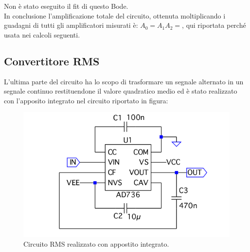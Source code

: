 \documentclass[10pt,a4paper]{article}
\begin{document}
Non è stato eseguito il fit di questo Bode.\\

In conclusione l'amplificazione totale del circuito, ottenuta moltiplicando i guadagni di tutti gli amplificatori misurati è: $A_0 = A_1 A_2 = $, qui riportata perché usata nei calcoli seguenti.\\

\subsection{Convertitore RMS}
L'ultima parte del circuito ha lo scopo di trasformare un segnale alternato in un segnale continuo restituendone il valore quadratico medio ed è stato realizzato con l'apposito integrato nel circuito riportato in figura:

\begin{figure}[!htb]
\centering
\includegraphics[scale=0.5]{rms.png}
\caption{Circuito RMS realizzato con appostito integrato.\label{rms}}
\end{figure}
\end{document}
